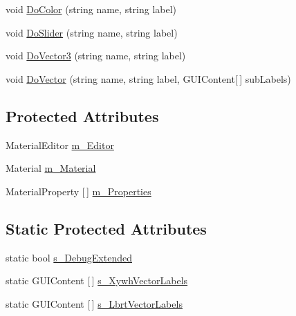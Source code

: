 \begin{DoxyCompactItemize}
\item 
void \mbox{\hyperlink{class_t_m_pro_1_1_editor_utilities_1_1_t_m_p___base_shader_g_u_i_a7f787e8efc629d8f87d64cf39b3b90ea}{Do\+Color}} (string name, string label)
\item 
void \mbox{\hyperlink{class_t_m_pro_1_1_editor_utilities_1_1_t_m_p___base_shader_g_u_i_a9278fc8116e980740730349bb7eefae1}{Do\+Slider}} (string name, string label)
\item 
void \mbox{\hyperlink{class_t_m_pro_1_1_editor_utilities_1_1_t_m_p___base_shader_g_u_i_aab81e299b6bf1facf1516791363f506a}{Do\+Vector3}} (string name, string label)
\item 
void \mbox{\hyperlink{class_t_m_pro_1_1_editor_utilities_1_1_t_m_p___base_shader_g_u_i_a6eea04ec09167d1fb27859fa72ceccdb}{Do\+Vector}} (string name, string label, G\+U\+I\+Content\mbox{[}$\,$\mbox{]} sub\+Labels)
\end{DoxyCompactItemize}
\subsection*{Protected Attributes}
\begin{DoxyCompactItemize}
\item 
Material\+Editor \mbox{\hyperlink{class_t_m_pro_1_1_editor_utilities_1_1_t_m_p___base_shader_g_u_i_ae42b49b4a8ac0302df2a897428d8c021}{m\+\_\+\+Editor}}
\item 
Material \mbox{\hyperlink{class_t_m_pro_1_1_editor_utilities_1_1_t_m_p___base_shader_g_u_i_a2cad2ee0e2fb562872b5dded13294a1c}{m\+\_\+\+Material}}
\item 
Material\+Property \mbox{[}$\,$\mbox{]} \mbox{\hyperlink{class_t_m_pro_1_1_editor_utilities_1_1_t_m_p___base_shader_g_u_i_af34d65ed45b8cc1e90a2d1e61f4af8f7}{m\+\_\+\+Properties}}
\end{DoxyCompactItemize}
\subsection*{Static Protected Attributes}
\begin{DoxyCompactItemize}
\item 
static bool \mbox{\hyperlink{class_t_m_pro_1_1_editor_utilities_1_1_t_m_p___base_shader_g_u_i_a22d7e05eae9963523b827e20e4d02d66}{s\+\_\+\+Debug\+Extended}}
\item 
static G\+U\+I\+Content \mbox{[}$\,$\mbox{]} \mbox{\hyperlink{class_t_m_pro_1_1_editor_utilities_1_1_t_m_p___base_shader_g_u_i_a66f48583d3d9e461112efa8fc0e78695}{s\+\_\+\+Xywh\+Vector\+Labels}}
\item 
static G\+U\+I\+Content \mbox{[}$\,$\mbox{]} \mbox{\hyperlink{class_t_m_pro_1_1_editor_utilities_1_1_t_m_p___base_shader_g_u_i_a903a4fee71cd5e892772505489c02f70}{s\+\_\+\+Lbrt\+Vector\+Labels}}
\end{DoxyCompactItemize}


